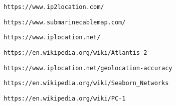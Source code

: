 \begin{thebibliography}{99}

  \texttt{https://www.ip2location.com/}

	\texttt{https://www.submarinecablemap.com/}

	\texttt{https://www.iplocation.net/}

	\texttt{https://en.wikipedia.org/wiki/Atlantis-2}

	\texttt{https://www.iplocation.net/geolocation-accuracy}

	\texttt{https://en.wikipedia.org/wiki/Seaborn\_Networks}

	\texttt{https://en.wikipedia.org/wiki/PC-1}

\end{thebibliography}
